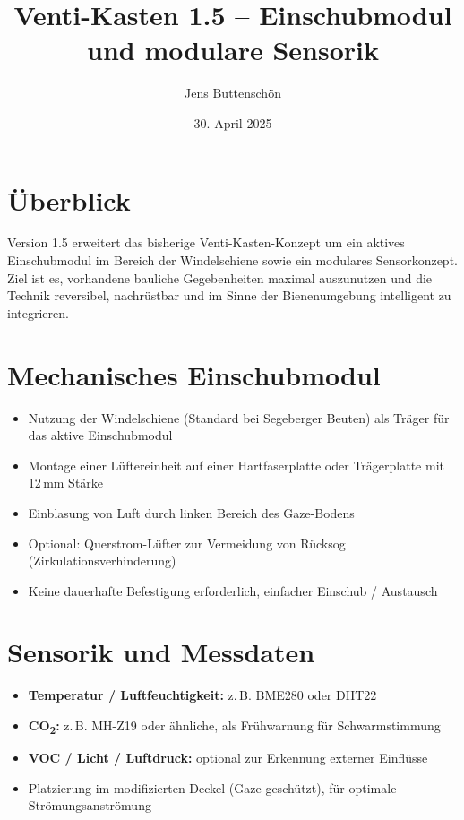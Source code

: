 \documentclass[11pt,a4paper]{article}
\title{\textbf{Venti-Kasten 1.5 – Einschubmodul und modulare Sensorik}}
\author{Jens Buttenschön}
\date{30. April 2025}
\begin{document}
\maketitle

\section*{Überblick}

Version 1.5 erweitert das bisherige Venti-Kasten-Konzept um ein aktives Einschubmodul im Bereich der Windelschiene sowie ein modulares Sensorkonzept. Ziel ist es, vorhandene bauliche Gegebenheiten maximal auszunutzen und die Technik reversibel, nachrüstbar und im Sinne der Bienenumgebung intelligent zu integrieren.

\section*{Mechanisches Einschubmodul}

\begin{itemize}[leftmargin=1.5em]
  \item Nutzung der Windelschiene (Standard bei Segeberger Beuten) als Träger für das aktive Einschubmodul
  \item Montage einer Lüftereinheit auf einer Hartfaserplatte oder Trägerplatte mit 12\,mm Stärke
  \item Einblasung von Luft durch linken Bereich des Gaze-Bodens
  \item Optional: Querstrom-Lüfter zur Vermeidung von Rücksog (Zirkulationsverhinderung)
  \item Keine dauerhafte Befestigung erforderlich, einfacher Einschub / Austausch
\end{itemize}

\section*{Sensorik und Messdaten}

\begin{itemize}[leftmargin=1.5em]
  \item \textbf{Temperatur / Luftfeuchtigkeit:} z.\,B. BME280 oder DHT22
  \item \textbf{CO\textsubscript{2}:} z.\,B. MH-Z19 oder ähnliche, als Frühwarnung für Schwarmstimmung
  \item \textbf{VOC / Licht / Luftdruck:} optional zur Erkennung externer Einflüsse
  \item Platzierung im modifizierten Deckel (Gaze geschützt), für optimale Strömungsanströmung
\end{itemize}
\end{document}
